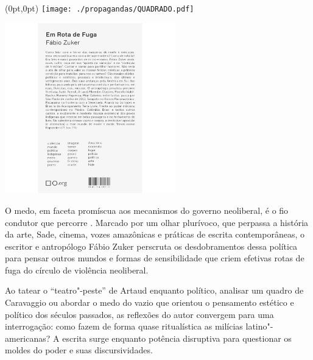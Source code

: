 \pagestyle{quadrado}
\label{quadrado}

\begin{textblock*}{5.625in}(0pt,0pt)%
\vspace*{-3.5cm}
\hspace*{-2.77cm}\texttt{[image: ./propagandas/QUADRADO.pdf]}
\end{textblock*}

\pagebreak %

\begin{center}
\hspace*{-3.6cm}
\hspace*{3.1cm}\includegraphics[width=74mm]{./grid/zuker.jpg}
\end{center}

\hspace*{-7cm}\hrulefill\hspace*{-7cm}

\medskip

\noindent{}O medo, em faceta promíscua aos mecanismos do governo neoliberal, é o fio condutor que percorre {}. Marcado por um olhar plurívoco, que perpassa a história da arte, Sade, cinema, vozes amazônicas e práticas de escrita contemporâneas, o escritor e antropólogo Fábio Zuker perscruta os desdobramentos dessa política para pensar outros mundos e formas de sensibilidade que criem efetivas rotas de fuga do círculo de violência neoliberal.

Ao tatear o “teatro"-peste” de Artaud enquanto político, analisar um quadro de Caravaggio ou abordar o medo do vazio que orientou o pensamento estético e político dos séculos passados, as reflexões do autor convergem para uma interrogação:  como fazem de forma quase ritualística as milícias latino"-americanas? A escrita surge enquanto potência disruptiva para questionar os moldes do poder e suas discursividades.

